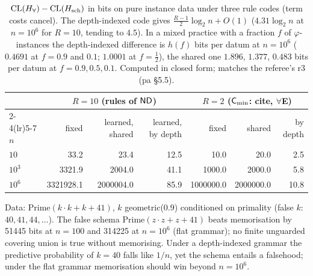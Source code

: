 \begin{table}[ht]\centering\footnotesize
\begin{tabular}{@{}lrrrrrr@{}}
\toprule
& \multicolumn{3}{c}{$R=10$ (rules of $\mathsf{ND}$)} & \multicolumn{3}{c}{$R=2$ ($\mathsf{C}_{\min}$: cite, $\forall$E)}\\
\cmidrule(lr){2-4}\cmidrule(lr){5-7}
$n$ & fixed & learned, shared & learned, by depth & fixed & shared & by depth\\
\midrule
$10$ & 33.2 & 23.4 & 12.5 & 10.0 & 20.0 & 2.5\\
$10^3$ & 3321.9 & 2004.0 & 41.1 & 1000.0 & 2000.0 & 5.8\\
$10^6$ & 3321928.1 & 2000004.0 & 85.9 & 1000000.0 & 2000000.0 & 10.8\\
\bottomrule
\end{tabular}
\caption{$\mathrm{CL}(H_{\forall})-\mathrm{CL}(H_{\mathrm{sch}})$ in bits on pure instance data under three rule codes (term costs cancel). The depth-indexed code gives $\frac{R-1}2\log_2n+O(1)$ ($4.31\log_2n$ at $n=10^6$ for $R=10$, tending to $4.5$). In a mixed practice with a fraction $f$ of $\varphi$-instances the depth-indexed difference is $h(f)$ bits per datum at $n=10^6$ ($0.4691$ at $f=0.9$ and $0.1$; $1.0001$ at $f=\frac12$), the shared one $1.896$, $1.377$, $0.483$ bits per datum at $f=0.9,0.5,0.1$. Computed in closed form; matches the referee's r3 (pa \S5.5).}\label{tab:pa:rulecode}
\end{table}

\begin{example}\pabrk{}\label{ex:pa:euler}
Data: $\mathrm{Prime}(k\cdot k+k+41)$, $k$ geometric($0.9$) conditioned on primality (false $k$: $40,41,44,\dots$). The false schema $\mathrm{Prime}(z\cdot z+z+41)$ beats memorisation by 51445 bits at $n=100$ and 314225 at $n=10^6$ (flat grammar); no finite unguarded covering union is true without memorising. Under a depth-indexed grammar the predictive probability of $k=40$ falls like $1/n$, yet the schema entails a falsehood; under the flat grammar memorisation should win beyond $n=10^6$.
\end{example}


